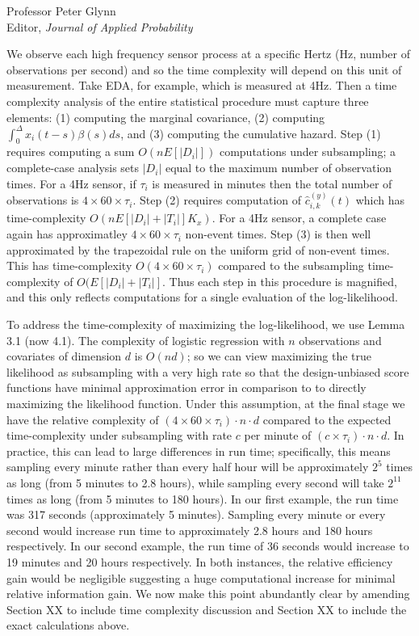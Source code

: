 \documentclass[11pt]{letter} %
\begin{document}
\begin{letter}{Professor
	Peter Glynn\\
	Editor, {\em Journal of Applied Probability}}
\begin{enumerate}
We observe each high frequency sensor process at a specific Hertz (Hz, number of observations per second) and so the time complexity will depend on this unit of measurement.  Take EDA, for example, which is measured at 4Hz.  Then a time complexity analysis of the entire statistical procedure must capture three elements: (1) computing the marginal covariance, (2) computing $\int_{0}^\Delta x_i (t-s) \beta(s) ds$, and (3) computing the cumulative hazard.  Step (1) requires computing a sum $O(n E\left[|D_i| \right])$ computations under subsampling; a complete-case analysis sets $|D_i|$ equal to the maximum number of observation times.  For a 4Hz sensor, if $\tau_i$ is measured in minutes then the total number of observations is $4 \times 60 \times \tau_i$.  Step (2) requires computation of $\hat c_{i,k}^{(y)} (t)$ which has time-complexity $O(n E \left[ |D_i| + |T_i| \right] K_x)$.  For a 4Hz sensor, a complete case again has approximatley $4 \times 60 \times \tau_i$ non-event times.  Step (3) is then well approximated by the trapezoidal rule on the uniform grid of non-event times.  This has time-complexity $O(4 \times 60 \times \tau_i)$ compared to the subsampling time-complexity of $O(E \left[ |D_i|  + |T_i| \right]$.  Thus each step in this procedure is magnified, and this only reflects computations for a single evaluation of the log-likelihood.
\vspace{5mm}

To address the time-complexity of maximizing the log-likelihood, we use Lemma 3.1 (now 4.1).  The complexity of logistic regression with $n$ observations and covariates of dimension $d$ is $O(nd)$; so we can view maximizing the true likelihood as subsampling with a very high rate so that the design-unbiased score functions have minimal approximation error in comparison to to directly maximizing the likelihood function.  Under this assumption, at the final stage we have the relative complexity of $(4 \times 60 \times \tau_i) \cdot n \cdot d$ compared to the expected time-complexity under subsampling with rate $c$ per minute of $(c \times \tau_i) \cdot n \cdot d$.  In practice, this can lead to large differences in run time; specifically, this means sampling every minute rather than every half hour will be approximately $2^5$ times as long (from 5 minutes to 2.8 hours), while sampling every second will take $2^11$ times as long (from 5 minutes to 180 hours).  In our first example, the run time was 317 seconds (approximately 5 minutes). Sampling every minute or every second would increase run time to approximately 2.8 hours and 180 hours respectively.  In our second example, the run time of 36 seconds would increase to 19 minutes and 20 hours respectively.  In both instances, the relative efficiency gain would be negligible suggesting a huge computational increase for minimal relative information gain.  We now make this point abundantly clear by amending Section XX to include time complexity discussion and Section XX to include the exact calculations above.



\end{enumerate}
\end{letter}
\end{document}
